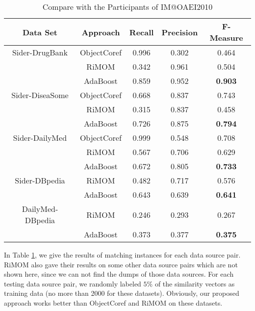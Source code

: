 \begin{table}[t]
\caption{Compare with the Participants of IM@OAEI2010}
\label{tab:oaei}
\centering
\begin{tabular}{c|c|c|c|c}
  \toprule
  Data Set & Approach & Recall & Precision & F-Measure  \\
  \midrule
    Sider-DrugBank & ObjectCoref & 0.996 & 0.302 & 0.464 \\
    & RiMOM & 0.342 & 0.961 & 0.504 \\
    & AdaBoost & 0.859 & 0.952 & \textbf{0.903} \\
  \midrule
    Sider-DiseaSome & ObjectCoref & 0.668 & 0.837 & 0.743 \\
    & RiMOM & 0.315 & 0.837 & 0.458 \\
    & AdaBoost & 0.726 & 0.875 & \textbf{0.794} \\
  \midrule
    Sider-DailyMed & ObjectCoref & 0.999 & 0.548 & 0.708 \\
    & RiMOM & 0.567 & 0.706 & 0.629 \\
    & AdaBoost & 0.672 & 0.805 & \textbf{0.733} \\
  \midrule
    Sider-DBpedia & RiMOM & 0.482 & 0.717 & 0.576 \\
    & AdaBoost & 0.643 & 0.639 & \textbf{0.641} \\
  \midrule
    DailyMed-DBpedia & RiMOM & 0.246 & 0.293 & 0.267 \\
    & AdaBoost & 0.373 & 0.377 & \textbf{0.375} \\
  \bottomrule
\end{tabular}
\end{table}

In Table \ref{tab:oaei}, we give the results of matching instances for each data source pair. RiMOM also gave their results on some other data source pairs which are not shown here, since we can not find the dumps of those data sources. For each testing data source pair, we randomly labeled $5\%$ of the similarity vectors as training data (no more than 2000 for these datasets). Obviously, our proposed approach works better than ObjectCoref and RiMOM on these datasets.

